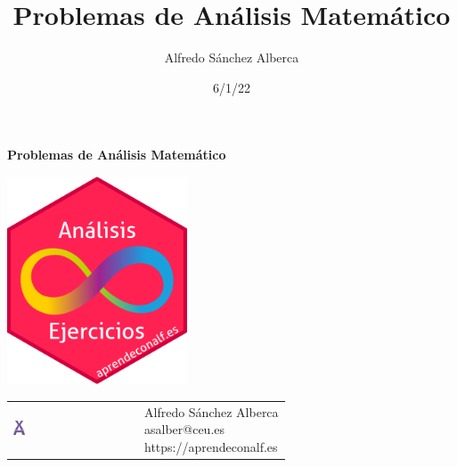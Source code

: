 \documentclass[
  a4paper,
]{scrreport}
\title{Problemas de Análisis Matemático}
\author{Alfredo Sánchez Alberca}
\date{6/1/22}
\renewcommand*\contentsname{Tabla de contenidos}
\newcommand\contentsname{Tabla de contenidos}
\theoremstyle{definition}
\theoremstyle{remark}
\begin{document}
\begin{titlepage}

\begin{center}
\vspace*{5cm}

\Huge
{\textbf{\textsf{Problemas de Análisis Matemático}}}

\vspace{0.5cm}
\LARGE
{\textbf{\textsf{}}}

\vspace{1.5cm}

\includegraphics[width=0.4\textwidth]{img/logos/sticker.png}
\end{center}

\vfill

\begin{flushleft}
\begin{tabular}{ll}
\includegraphics[width=0.1\textwidth]{img/logos/aprendeconalf.png} & \parbox[b]{5cm}{\Large\textsf{Alfredo
Sánchez
Alberca}\\ \textsf{asalber@ceu.es} \\ \textsf{https://aprendeconalf.es}}
\end{tabular}
\end{flushleft}
\end{titlepage}\ifdefined\Shaded\renewenvironment{Shaded}{\begin{tcolorbox}[sharp corners, breakable, borderline west={3pt}{0pt}{shadecolor}, enhanced, interior hidden, frame hidden, boxrule=0pt]}{\end{tcolorbox}}\fi

\renewcommand*\contentsname{Tabla de contenidos}
{
\hypersetup{linkcolor=}
\setcounter{tocdepth}{2}
\tableofcontents
}
\end{document}
